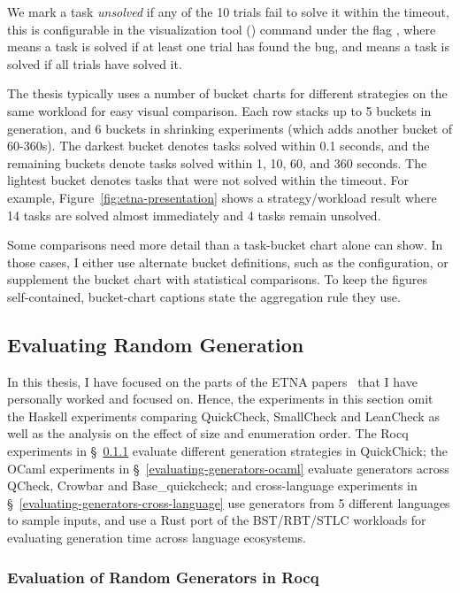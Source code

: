 We mark a task \emph{unsolved} if any of the 10 trials fail to solve it within the
timeout, this is configurable in the visualization tool () command
under the flag , where  means a task is solved if at least one
trial has found the bug, and  means a task is solved if all trials have
solved it.

The thesis typically uses a number of bucket charts for different strategies on the
same workload for easy visual comparison. Each row stacks up to 5 buckets in
generation, and 6 buckets in shrinking experiments (which adds another bucket of
60-360s). The darkest bucket denotes tasks solved within 0.1 seconds, and the remaining
buckets denote tasks solved within 1, 10, 60, and 360 seconds. The lightest bucket
denotes tasks that were not solved within the timeout. For example,
Figure~\ref{fig:etna-presentation} shows a strategy/workload result where 14 tasks are
solved almost immediately and 4 tasks remain unsolved.

Some comparisons need more detail than a task-bucket chart alone can show. In those
cases, I either use alternate bucket definitions, such as the  configuration,
or supplement the bucket chart with statistical comparisons. To keep the figures
self-contained, bucket-chart captions state the aggregation rule they use.

\subsection{Evaluating Random Generation}\label{evaluating-generators}

In this thesis, I have focused on the parts of the ETNA papers~\cite{etna-icfp23,
  etna-jfp} that I have personally worked and focused on. Hence, the experiments in this
section omit the Haskell experiments comparing QuickCheck, SmallCheck and LeanCheck as
well as the analysis on the effect of size and enumeration order. The Rocq experiments
in \S~\ref{evaluating-generators-rocq} evaluate different generation strategies in
QuickChick; the OCaml experiments in \S~\ref{evaluating-generators-ocaml} evaluate
generators across QCheck, Crowbar and Base\_quickcheck; and cross-language experiments
in \S~\ref{evaluating-generators-cross-language} use generators from 5 different
languages to sample inputs, and use a Rust port of the BST/RBT/STLC workloads for
evaluating generation time across language ecosystems.

\subsubsection{Evaluation of Random Generators in Rocq}\label{evaluating-generators-rocq}

